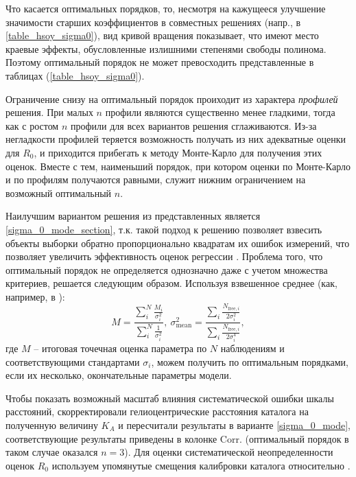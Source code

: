 \documentclass{matmex-diploma-custom}
\begin{document}
\par Что касается оптимальных порядков, то, несмотря на кажущееся улучшение значимости старших коэффициентов в совместных решениях (напр., в \ref{table_hsoy_sigma0}), вид кривой вращения показывает, что имеют место краевые эффекты, обусловленные излишними степенями свободы полинома.  Поэтому оптимальный порядок не может превосходить представленные в таблицах (\ref{table_hsoy_sigma0}). 
\par Ограничение снизу на оптимальный порядок проиходит из характера \textit{профилей} решения. При малых $n$ профили являются существенно менее гладкими, тогда как с ростом $n$ профили для всех вариантов решения сглаживаются. Из-за негладкости профилей теряется возможность получать из них адекватные оценки для $R_0$, и приходится прибегать к методу Монте-Карло для получения этих оценок. Вместе с тем, наименьший порядок, при котором оценки по Монте-Карло и по профилям получаются равными, служит нижним ограничением на возможный оптимальный $n$.
\par Наилучшим вариантом решения из представленных является \ref{sigma_0_mode_section}, т.к. такой подход к решению позволяет взвесить объекты выборки обратно пропорционально квадратам их ошибок измерений, что позволяет увеличить эффективность оценок регрессии \cite{Valeev}. Проблема того, что оптимальный порядок не определяется однозначно даже с учетом множества критериев, решается следующим образом. Используя взвешенное среднее (как, например, в \cite{Camarillo}):
\begin{equation}
        M = \frac{\sum_i^N \frac{M_i}{\sigma_i^2}}{\sum_i^N \frac{1}{\sigma_i^2}}, ~\sigma^2_{\mathrm{mean}} = \frac{\sum_i \frac{N_{\mathrm{free}, i}}{2 \sigma_i^2}}{\sum_i \frac{N_{\mathrm{free}, i}}{2\sigma_i^4}}, 
\end{equation}
где $M$ -- итоговая точечная оценка параметра по $N$ наблюдениям и соответствующими стандартами $\sigma_i$, можем получить по оптимальным порядками, если их несколько, окончательные параметры модели.
\par Чтобы показать возможный масштаб влияния систематической ошибки шкалы расстояний, скорректировали гелиоцентрические расстояния каталога на полученную величину $K_A$ и пересчитали результаты в варианте \ref{sigma_0_mode}, соответствующие результаты приведены в колонке \textrm{Corr.} (оптимальный порядок в таком случае оказался $n=3$). Для оценки систематической неопределенности оценок $R_0$ используем упомянутые смещения калибровки каталога относительно \cite{Groenewegen}. 
\end{document}
